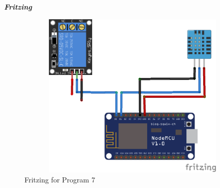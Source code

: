 \documentclass[12pt,a4paper]{article}
\begin{document}
\begin{flushleft}
\textbf{\textit{Fritzing}} \\
\begin{figure}[h!]
    \centering
	\includegraphics[width=12cm, height=8cm]{Prog7.png}
	\caption{Fritzing for Program 7}
\end{figure}
\end{flushleft}
\end{document}
